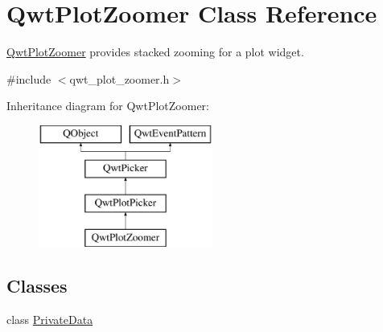 \hypertarget{class_qwt_plot_zoomer}{\section{Qwt\-Plot\-Zoomer Class Reference}
\label{class_qwt_plot_zoomer}
}


\hyperlink{class_qwt_plot_zoomer}{Qwt\-Plot\-Zoomer} provides stacked zooming for a plot widget.  




{\ttfamily \#include $<$qwt\-\_\-plot\-\_\-zoomer.\-h$>$}

Inheritance diagram for Qwt\-Plot\-Zoomer\-:\begin{figure}[H]
\begin{center}
\leavevmode
\includegraphics[height=4.000000cm]{class_qwt_plot_zoomer}
\end{center}
\end{figure}
\subsection*{Classes}
\begin{DoxyCompactItemize}
\item 
class \hyperlink{class_qwt_plot_zoomer_1_1_private_data}{Private\-Data}
\end{DoxyCompactItemize}
